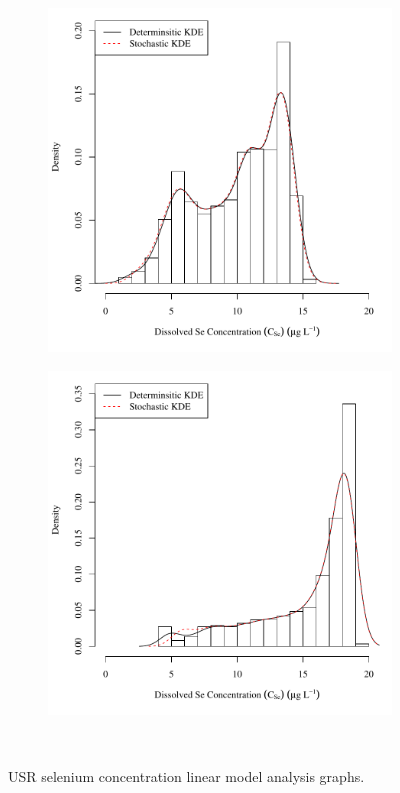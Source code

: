 \subfiguremid
\begin{landscape}
	\begin{figure}
		\begin{subfigure}{0.7\textwidth}
			\centering
			\includegraphics[width=\tableCustomSize]{"Figures/Results_USR/Stochastic/c d&s est HOL"}
		\end{subfigure}%
		\begin{subfigure}{0.7\textwidth}
			\centering
			\includegraphics[width=\tableCustomSize]{"Figures/Results_USR/Stochastic/c d&s est HRC"}
		\end{subfigure}\\
		\caption{USR selenium concentration linear model analysis graphs.}
	\end{figure}
\end{landscape}

